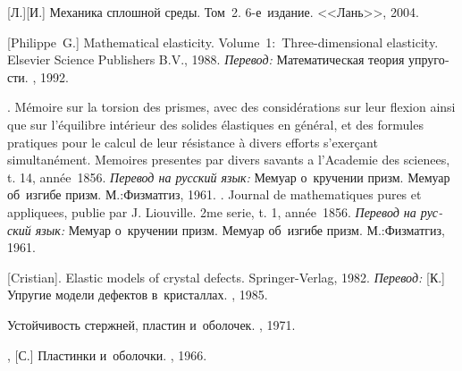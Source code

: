 \begin{thebibliography}{123}
\begin{otherlanguage}{russian}
[Л.][И.] Механика сплошной среды. Том~2. 6\hbox{-}е~издание. <<Лань>>, 2004.

[Philippe~G.]
Mathematical elasticity.
Volume~1:~Three\hbox{-}dimensional elasticity.
Elsevier Science Publishers B.\hspace{.1ex}V\hspace{-0.2ex}.,
1988.
\emph{Перевод:}
Математическая теория упругости.
\mirpublisher,
1992.

.
%
Mémoire sur la torsion des prismes, avec des considérations sur leur flexion ainsi que sur l'équilibre intérieur des solides élastiques en général, et des formules pratiques pour le calcul de leur résistance à divers efforts s’exerçant simultanément.
%
Memoires presentes par divers savants a l'Academie des scienees, t. 14, année~1856.
\emph{Перевод на русский язык:}
Мемуар о~кручении призм.
Мемуар об~изгибе призм.
М.:\;Физ\-мат\-гиз, 1961.
%
.
Journal de mathematiques pures et appliquees, publie par J. Liouville.
2me serie, t. 1, année~1856.
%
\emph{Перевод на русский язык:}
Мемуар о~кручении призм.
Мемуар об~изгибе призм.
М.:\;Физ\-мат\-гиз, 1961.

[Cristian]. Elastic models of crystal defects. Springer\hbox{-}Verlag, 1982. 
\emph{Перевод:} [К.] Упругие модели дефектов в~кристаллах. \mirpublisher, 1985. 

Устойчивость стержней, пластин и~оболочек.
\naukapublisher, 1971.

,
[С.]
Пластинки и~оболочки.
\naukapublisher, 1966.


\end{otherlanguage}
\end{thebibliography}
